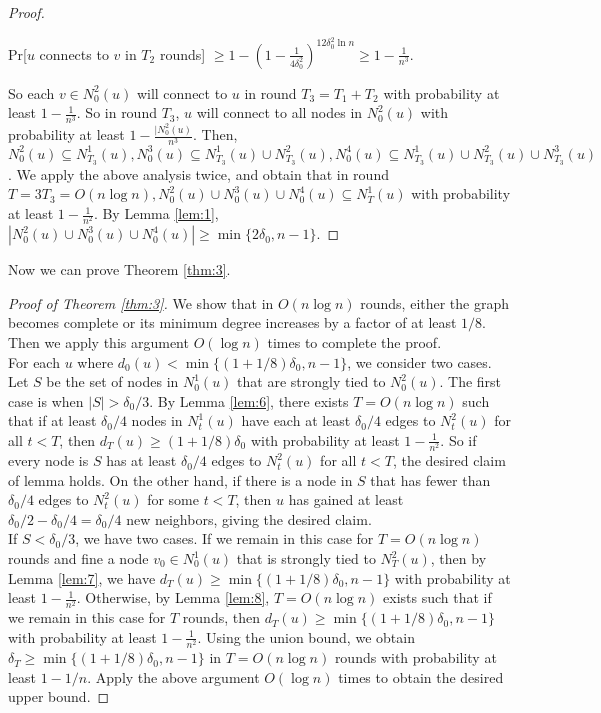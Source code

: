 \documentclass[
10pt, %
a4paper, %
oneside, %
headinclude,footinclude, %
BCOR5mm, %
]{scrartcl}
\begin{document}
\begin{proof}
	\begin{center}
		Pr[$u$ connects to $v$ in $T_2$ rounds] $\geq 1 - (1 - \frac{1}{4\delta_0^2})^{12\delta_0^2 \ln n} \geq 1- \frac{1}{n^3}$.
	\end{center}
	So each $v \in N_0^2(u)$ will connect to $u$ in round $T_3 = T_1 + T_2$ with probability at least $1 - \frac{1}{n^3}$. So in round $T_3$, $u$ will connect to all nodes in $N_0^2(u)$ with probability at least $1 - \frac{|N_0^2(u)}{n^3}$. Then, $N_0^2(u) \subseteq N_{T_3}^1(u), N_0^3(u) \subseteq N_{T_3}^1(u) \cup N_{T_3}^2(u), N_0^4(u) \subseteq N_{T_3}^1(u) \cup N_{T_3}^2(u) \cup  N_{T_3}^3(u)$. We apply the above analysis twice, and obtain that in round $T = 3T_3 = O(n\log n), N_0^2(u) \cup N_0^3(u) \cup  N_0^4(u) \subseteq N_T^1(u)$ with probability at least $ 1 - \frac{1}{n^2}$. By Lemma \ref{lem:1}, $| N_0^2(u) \cup N_0^3(u) \cup  N_0^4(u)| \geq \min\{2\delta_0, n-1\}$.
\end{proof}

Now we can prove Theorem \ref{thm:3}.
\begin{proof}[Proof of Theorem \ref{thm:3}]
	We show that in $O(n\log n)$ rounds, either the graph becomes complete or its minimum degree increases by a factor of at least $1/8$. Then we apply this argument $O(\log n)$ times to complete the proof.\\
	For each $u$ where $d_0(u) < \min \{(1+1/8)\delta_0, n - 1\}$, we consider two cases. Let $S$ be the set of nodes in $N_0^1(u)$ that are strongly tied to $N_0^2(u)$. The first case is when $|S| > \delta_0/3$. By Lemma \ref{lem:6}, there exists $T = O(n \log n)$ such that if at least $\delta_0/4$ nodes in $N_t^1(u)$ have each at least $\delta_0/4$ edges to $N_t^2(u)$ for all $t < T$, then $d_T(u) \geq (1+1/8)\delta_0$ with probability at least $ 1 - \frac{1}{n^2}$. So if every node is $S$ has at least $\delta_0/4$ edges to $N_t^2(u)$ for all $ t < T$, the desired claim of lemma holds. On the other hand, if there is a node in $S$ that has fewer than $\delta_0/4$ edges to $N_t^2(u)$ for some $t < T$, then $u$ has gained at least $\delta_0/2 - \delta_0/4 = \delta_0/4$ new neighbors, giving the desired claim. \\
	If $S < \delta_0/3$, we have two cases. If we remain in this case for $T = O(n \log n)$ rounds and fine a node $v_0 \in N_0^1(u)$ that is strongly tied to $N_T^2(u)$, then by Lemma \ref{lem:7}, we have $d_T(u) \geq \min \{(1+1/8)\delta_0, n - 1\}$ with probability at least $1 - \frac{1}{n^2}$. Otherwise, by Lemma \ref{lem:8}, $T = O(n \log n)$ exists such that if we remain in this case for $T$ rounds, then $d_T(u) \geq  \min \{(1+1/8)\delta_0, n - 1\}$ with probability at least $1 - \frac{1}{n^2}$. Using the union bound, we obtain $\delta_T \geq \min \{(1+1/8)\delta_0, n - 1\}$ in $T = O(n \log n)$ rounds with probability at least $1 - 1/n$. Apply the above argument $O(\log n)$ times to obtain the desired upper bound.
\end{proof}
\end{document}
